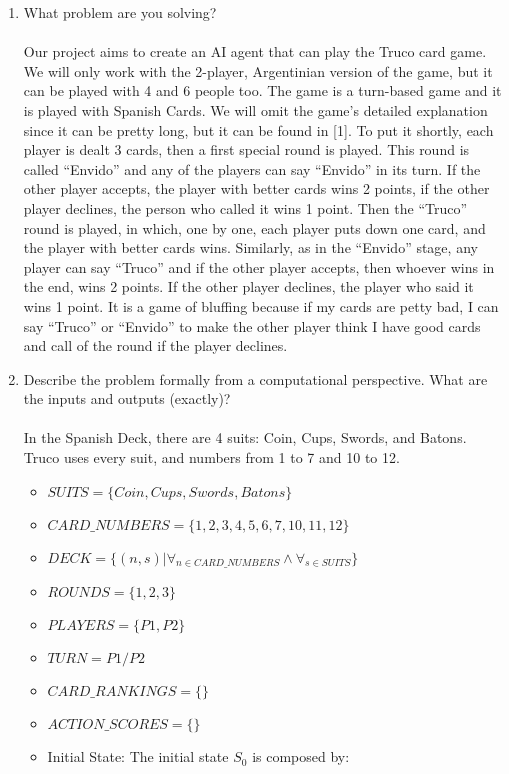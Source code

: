 \documentclass{article}
\begin{document}
\begin{enumerate}
\item What problem are you solving?
\\\\
Our project aims to create an AI agent that can play the Truco card game. We will only work with the 2-player, Argentinian version of the game, but it can be played with 4 and 6 people too. The game is a turn-based game and it is played with Spanish Cards. We will omit the game’s detailed explanation since it can be pretty long, but it can be found in [1]. To put it shortly, each player is dealt 3 cards, then a first special round is played. This round is called “Envido” and any of the players can say “Envido” in its turn. If the other player accepts, the player with better cards wins 2 points, if the other player declines, the person who called it wins 1 point. Then the “Truco” round is played, in which, one by one, each player puts down one card, and the player with better cards wins. Similarly, as in the “Envido” stage, any player can say “Truco” and if the other player accepts, then whoever wins in the end, wins 2 points. If the other player declines, the player who said it wins 1 point. It is a game of bluffing because if my cards are petty bad, I can say “Truco” or “Envido” to make the other player think I have good cards and call of the round if the player declines.
\\
\item Describe the problem formally from a computational perspective. What are the inputs and outputs (exactly)?
\\\\
In the Spanish Deck, there are 4 suits: Coin, Cups, Swords, and Batons. Truco uses every suit, and numbers from 1 to 7 and 10 to 12.
\begin{itemize}
	\item $SUITS = \{Coin, Cups, Swords, Batons\}$
	\item $CARD\_NUMBERS = \{1, 2, 3, 4, 5, 6, 7, 10, 11, 12\}$
	\item $DECK = \{(n, s) | \forall_{n \in CARD\_NUMBERS} \land \forall_{s \in SUITS} \}$
	\item $ROUNDS = \{1, 2, 3\}$
	\item $PLAYERS = \{P1, P2\}$
	\item $TURN = P1/P2$
	\item $CARD\_RANKINGS = \{  \}$
	\item $ACTION\_SCORES = \{  \}$
	\item Initial State: The initial state $S_0$ is composed by:
	\begin{enumerate}

\end{enumerate}
\end{itemize}
\end{enumerate}
\end{document}
